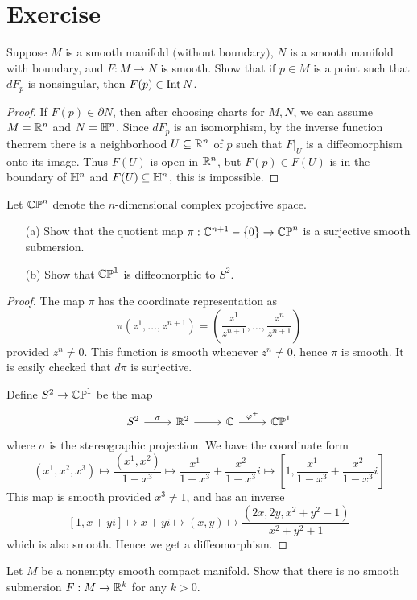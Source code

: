 \section{Exercise}
\begin{exercise}\label{smooth map not boundary}
Suppose $M$ is a smooth manifold $($without boundary$)$, $N$ is a smooth manifold with boundary, and $F:M\to N$ is smooth. Show that if $p\in M$ is a point such that 
$dF_p$ is nonsingular, then $F(p)\in\mathrm{Int}\, N$.
\end{exercise}
\begin{proof}
If $F(p)\in\partial N$, then after choosing charts for $M,N$, we can assume $M=\mathbb{R}^n$ and $N=\mathbb{H}^n$. Since $dF_p$ is an isomorphism, by the inverse function theorem 
there is a neighborhood $U\subseteq\mathbb{R}^n$ of $p$ such that $F|_{U}$ is a diffeomorphism onto its image. Thus $F(U)$ is open in $\mathbb{R}^n$, but $F(p)\in F(U)$ is in the boundary 
of $\mathbb{H}^n$ and $F(U)\subseteq\mathbb{H}^n$, this is impossible.
\end{proof}
\begin{exercise}
Let $\mathbb{CP}^n$ denote the $n$-dimensional complex projective space.
\begin{itemize}
\item[(a)]Show that the quotient map $\pi:\mathbb{C}^{n+1}-\{0\}\to\mathbb{CP}^n$ is a surjective
smooth submersion.
\item[(b)]Show that $\mathbb{CP}^1$ is diffeomorphic to $S^2$.
\end{itemize}
\end{exercise}
\begin{proof}
The map $\pi$ has the coordinate representation as
\[\pi(z^1,\dots,z^{n+1})=(\frac{z^1}{z^{n+1}},\dots,\frac{z^{n}}{z^{n+1}})\]
provided $z^n\neq 0$. This function is smooth whenever $z^n\neq 0$, hence $\pi$ is smooth. It is easily checked that $d\pi$ is surjective.\par
Define $S^2\to\mathbb{CP}^1$ be the map
\[\begin{tikzcd}
S^2\ar[r,"\sigma"]&\R^2\ar[r]&\C\ar[r,"\varphi^+"]&\CP^1
\end{tikzcd}\]
where $\sigma$ is the stereographic projection. We have the coordinate form
\[(x^1,x^2,x^3)\mapsto\frac{(x^1,x^2)}{1-x^3}\mapsto\frac{x^1}{1-x^3}+\frac{x^2}{1-x^3}i\mapsto[1,\frac{x^1}{1-x^3}+\frac{x^2}{1-x^3}i]\]
This map is smooth provided $x^3\neq 1$, and has an inverse
\[[1,x+yi]\mapsto x+yi\mapsto(x,y)\mapsto\frac{(2x,2y,x^2+y^2-1)}{x^2+y^2+1}\]
which is also smooth. Hence we get a diffeomorphism.
\end{proof}
\begin{exercise}
Let $M$ be a nonempty smooth compact manifold. Show that there is no smooth submersion $F:M\to\mathbb{R}^k$ for any $k>0$.
\end{exercise}
